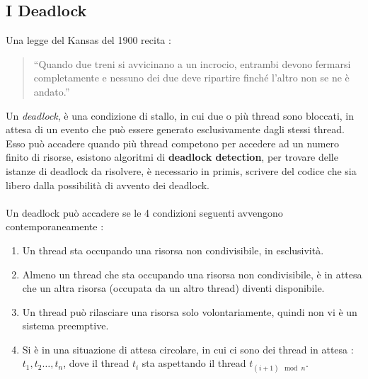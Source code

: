 \documentclass[12pt, letterpaper]{article}
\newcommand{\acc}{\\\hphantom{}\\}
\begin{document}
\subsection{I Deadlock}
Una legge del Kansas del 1900 recita : \begin{quote}
    “Quando due treni si avvicinano a un incrocio, entrambi devono fermarsi completamente e
     nessuno dei due deve ripartire finché l’altro non se ne è andato.”
\end{quote}
Un \textit{deadlock}, è una condizione di stallo, in cui due o più thread sono bloccati, in attesa di un 
evento che può essere generato esclusivamente dagli stessi thread. Esso può accadere quando più thread competono 
per accedere ad un numero finito di risorse, esistono algoritmi di \textbf{deadlock detection}, per trovare delle 
istanze di deadlock da risolvere, è necessario in primis, scrivere del codice che sia libero dalla possibilità di 
avvento dei deadlock. \acc Un deadlock può accadere se le 4 condizioni seguenti avvengono contemporaneamente : \begin{enumerate}
    \item Un thread sta occupando una risorsa non condivisibile, in esclusività.
    \item Almeno un thread che sta occupando una risorsa non condivisibile, è in attesa che un altra risorsa (occupata 
    da un altro thread) diventi disponibile.
    \item Un thread può rilasciare una risorsa solo volontariamente, quindi non vi è un sistema preemptive. 
    \item Si è in una situazione di attesa circolare, in cui ci sono dei thread in attesa : \(t_1,t_2\dots,t_n\), dove 
    il thread \(t_i\) sta aspettando il thread \(t_{(i+1)\mod n}\).
\end{enumerate}
\end{document}
